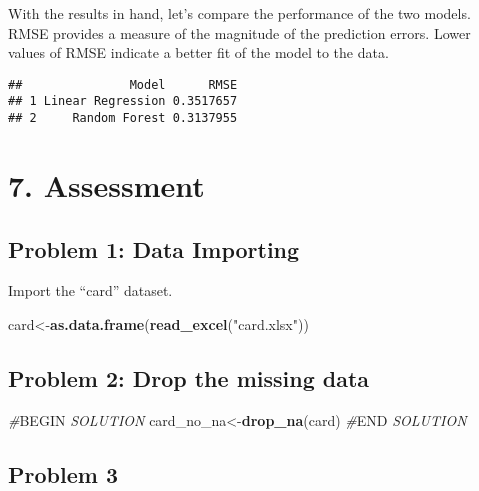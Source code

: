 \documentclass[
]{article}
\newenvironment{Shaded}{\begin{snugshade}}{\end{snugshade}}
\newcommand{\CommentTok}[1]{\textcolor[rgb]{0.56,0.35,0.01}{\textit{#1}}}
\newcommand{\FunctionTok}[1]{\textcolor[rgb]{0.13,0.29,0.53}{\textbf{#1}}}
\newcommand{\NormalTok}[1]{#1}
\newcommand{\OtherTok}[1]{\textcolor[rgb]{0.56,0.35,0.01}{#1}}
\newcommand{\RegionMarkerTok}[1]{#1}
\newcommand{\StringTok}[1]{\textcolor[rgb]{0.31,0.60,0.02}{#1}}
\begin{document}
With the results in hand, let's compare the performance of the two
models. RMSE provides a measure of the magnitude of the prediction
errors. Lower values of RMSE indicate a better fit of the model to the
data.

\begin{verbatim}
##               Model      RMSE
## 1 Linear Regression 0.3517657
## 2     Random Forest 0.3137955
\end{verbatim}

\hypertarget{assessment}{%
\section{7. Assessment}\label{assessment}}

\hypertarget{problem-1-data-importing}{%
\subsection{Problem 1: Data Importing}\label{problem-1-data-importing}}

Import the ``card'' dataset.

\begin{Shaded}
\begin{Highlighting}[]
\NormalTok{card}\OtherTok{\textless{}{-}}\FunctionTok{as.data.frame}\NormalTok{(}\FunctionTok{read\_excel}\NormalTok{(}\StringTok{"card.xlsx"}\NormalTok{))}
\end{Highlighting}
\end{Shaded}

\hypertarget{problem-2-drop-the-missing-data}{%
\subsection{Problem 2: Drop the missing
data}\label{problem-2-drop-the-missing-data}}

\begin{Shaded}
\begin{Highlighting}[]
\CommentTok{\#}\RegionMarkerTok{BEGIN}\CommentTok{ SOLUTION}
\NormalTok{card\_no\_na}\OtherTok{\textless{}{-}}\FunctionTok{drop\_na}\NormalTok{(card)}
\CommentTok{\#}\RegionMarkerTok{END}\CommentTok{ SOLUTION}
\end{Highlighting}
\end{Shaded}

\hypertarget{problem-3}{%
\subsection{Problem 3}\label{problem-3}}
\end{document}
